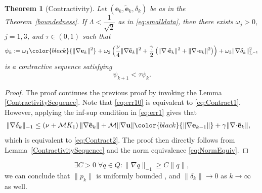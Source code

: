 \documentclass[3p]{elsarticle}
\newtheorem{theorem}{Theorem}
\def\V#1{\mathbf{#1}}
\def\Vt#1{\mathbf{\tilde{#1}}}
\newcommand{\Mbd}{\mathcal{M}}
\newcommand{\divergence}{\mathrm{\nabla \cdot}}
\newcommand{\Linvmap}{\mathrm{L^{-1}}}
\newcommand{\DY}[1]{{\color{black}{#1}}}
\begin{document}
\begin{theorem}[Contractivity]\label{contractivity} 
Let $(\V{e}_k, \Vt{e}_k, \delta_k)$ be as in the Theorem~\ref{boundedness}. If $\Lambda < \dfrac{1}{\sqrt{2}} $ as in \eqref{eq:smalldata}, then there exists $\omega_j>0$, $j=\overline{1,3}$, and $\tau \in (0,1)$ such that
 \begin{equation} 
\psi_k: = \omega_1 \DY{\| \nabla \V{e}_k \|^2}
+ \omega_2 \left( \frac{\nu}{4}\|\nabla \Vt{e}_{k} \|^2 + \frac{\gamma}{2} \left( \|\divergence \Vt{e}_{k} \|^2 + \|\divergence \V{e}_{k} \|^2 \right) \right)
+ \omega_3 \| \nabla \delta_k \|_{\Linvmap}^2
\label{eq:ContractionThm1}
 \end{equation}
is a contractive sequence satisfying
 \begin{equation}
     \psi_{k+1} < \tau \psi_k.
     \label{eq:ContractionThm2}
 \end{equation}
\end{theorem}
\begin{proof}
The proof continues the previous proof by invoking the Lemma \ref{ContractivitySequence}. Note that \eqref{eq:err10} is equivalent to \eqref{eq:Contract1}.
However, applying the inf-sup condition in \eqref{eq:err1} gives that 
\begin{equation}
\label{eq:ContractionThm3}
  \begin{aligned}
   \|\nabla \delta_k\|_{-1} & \le \left( \nu + \Mbd K_1\right)  \| \nabla \Vt{e}_k \| 
   + \Mbd \|\nabla \V{u} \|  \DY{ \| \nabla \V{e}_{k-1} \|} %
   + \gamma \| \divergence \Vt{e}_k \|,
    \end{aligned}
\end{equation}
which is equivalent to \eqref{eq:Contract2}. The proof then directly follows from Lemma~\ref{ContractivitySequence} and the norm equivalence \eqref{eq:NormEquiv}. 
\end{proof}
\begin{remark}
    \begin{equation}
        \label{eq:Necas}
      \exists C > 0 \;  \forall q \in Q: \| \nabla  q \|_{-1} \ge C \| q\|,
    \end{equation}
we can conclude that $\|p_k\|$ is uniformly bounded \DY{in $L^2(\Omega)$}, and $\|\delta_k\| \rightarrow 0$ as $k \rightarrow \infty$ as well. 
\end{remark}
\end{document}
